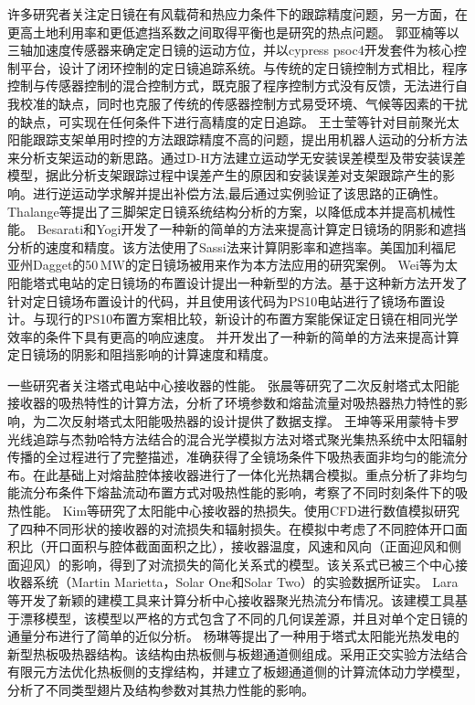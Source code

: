 许多研究者关注定日镜在有风载荷和热应力条件下的跟踪精度问题，另一方面，在更高土地利用率和更低遮挡系数之间取得平衡也是研究的热点问题。
郭亚楠等\cite{Guo2016}以三轴加速度传感器来确定定日镜的运动方位，并以cypress psoc4开发套件为核心控制平台，设计了闭环控制的定日镜追踪系统。与传统的定日镜控制方式相比，程序控制与传感器控制的混合控制方式，既克服了程序控制方式没有反馈，无法进行自我校准的缺点，同时也克服了传统的传感器控制方式易受环境、气候等因素的干扰的缺点，可实现在任何条件下进行高精度的定日追踪。
王士莹等\cite{Wang2017b}针对目前聚光太阳能跟踪支架单用时控的方法跟踪精度不高的问题，提出用机器人运动的分析方法来分析支架运动的新思路。通过D-H方法建立运动学无安装误差模型及带安装误差模型，据此分析支架跟踪过程中误差产生的原因和安装误差对支架跟踪产生的影响。进行逆运动学求解并提出补偿方法,最后通过实例验证了该思路的正确性。
Thalange等\cite{Thalange2017}提出了三脚架定日镜系统结构分析的方案，以降低成本并提高机械性能。
Besarati和Yogi\cite{Besarati2014}开发了一种新的简单的方法来提高计算定日镜场的阴影和遮挡分析的速度和精度。该方法使用了Sassi法\cite{Sassi1983}来计算阴影率和遮挡率。美国加利福尼亚州Dagget的50$\,\mathrm{MW}$的定日镜场被用来作为本方法应用的研究案例。
Wei等\cite{Wei2010}为太阳能塔式电站的定日镜场的布置设计提出一种新型的方法。基于这种新方法开发了针对定日镜场布置设计的代码，并且使用该代码为PS10电站进行了镜场布置设计。与现行的PS10布置方案相比较，新设计的布置方案能保证定日镜在相同光学效率的条件下具有更高的响应速度。
并开发出了一种新的简单的方法来提高计算定日镜场的阴影和阻挡影响的计算速度和精度。

一些研究者关注塔式电站中心接收器的性能。
张晨等\cite{Zhang2015}研究了二次反射塔式太阳能接收器的吸热特性的计算方法，分析了环境参数和熔盐流量对吸热器热力特性的影响，为二次反射塔式太阳能吸热器的设计提供了数据支撑。
王坤等\cite{Wang2016a}采用蒙特卡罗光线追踪与杰勃哈特方法结合的混合光学模拟方法对塔式聚光集热系统中太阳辐射传播的全过程进行了完整描述，准确获得了全镜场条件下吸热表面非均匀的能流分布。在此基础上对熔盐腔体接收器进行了一体化光热耦合模拟。重点分析了非均匀能流分布条件下熔盐流动布置方式对吸热性能的影响，考察了不同时刻条件下的吸热性能。
Kim等\cite{Kim2015}研究了太阳能中心接收器的热损失。使用CFD进行数值模拟研究了四种不同形状的接收器的对流损失和辐射损失。在模拟中考虑了不同腔体开口面积比（开口面积与腔体截面面积之比），接收器温度，风速和风向（正面迎风和侧面迎风）的影响，得到了对流损失的简化关系式的模型。该关系式已被三个中心接收器系统（Martin Marietta，Solar One和Solar Two）的实验数据所证实。
Lara等\cite{Lara2016}开发了新颖的建模工具来计算分析中心接收器聚光热流分布情况。该建模工具基于漂移模型，该模型以严格的方式包含了不同的几何误差源，并且对单个定日镜的通量分布进行了简单的近似分析。
杨琳等\cite{Yang2015}提出了一种用于塔式太阳能光热发电的新型热板吸热器结构。该结构由热板侧与板翅通道侧组成。采用正交实验方法结合有限元方法优化热板侧的支撑结构，并建立了板翅通道侧的计算流体动力学模型，分析了不同类型翅片及结构参数对其热力性能的影响。

